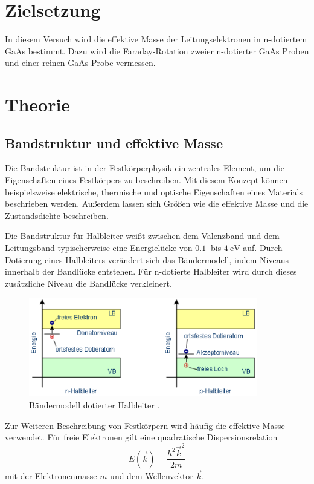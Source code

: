 \section{Zielsetzung}
In diesem Versuch wird die effektive Masse der Leitungselektronen in n-dotiertem GaAs bestimmt.
Dazu wird die Faraday-Rotation zweier n-dotierter GaAs Proben und einer reinen GaAs Probe vermessen.

\section{Theorie}
\subsection{Bandstruktur und effektive Masse}

Die Bandstruktur ist in der Festkörperphysik ein zentrales Element, um die Eigenschaften
eines Festkörpers zu beschreiben. Mit diesem Konzept können beispielsweise elektrische, thermische
und optische Eigenschaften eines Materials beschrieben werden. Außerdem lassen sich Größen wie die
effektive Masse und die Zustandsdichte beschreiben.

Die Bandstruktur für Halbleiter weißt zwischen dem Valenzband und dem Leitungsband typischerweise
eine Energielücke von $\SI{0,1}{}$ bis $\SI{4}{\eV}$ auf. Durch Dotierung eines Halbleiters
verändert sich das Bändermodell, indem Niveaus innerhalb der Bandlücke entstehen.
Für n-dotierte Halbleiter wird durch dieses zusätzliche Niveau die Bandlücke verkleinert.

\begin{figure}[H]
  \centering
  \includegraphics[width=10cm]{Bandstruktur.png}
  \caption{Bändermodell dotierter Halbleiter \cite{halbleiter}.}
  \label{fig:Band}
\end{figure}

Zur Weiteren Beschreibung von Festkörpern wird häufig die effektive Masse verwendet.
Für freie Elektronen gilt eine quadratische Dispersionsrelation
\begin{equation}
  E(\vec{k})=\frac{\hbar^2 \vec{k}^2}{2m}
\end{equation}
mit der Elektronenmasse $m$ und dem Wellenvektor $\vec{k}$.

